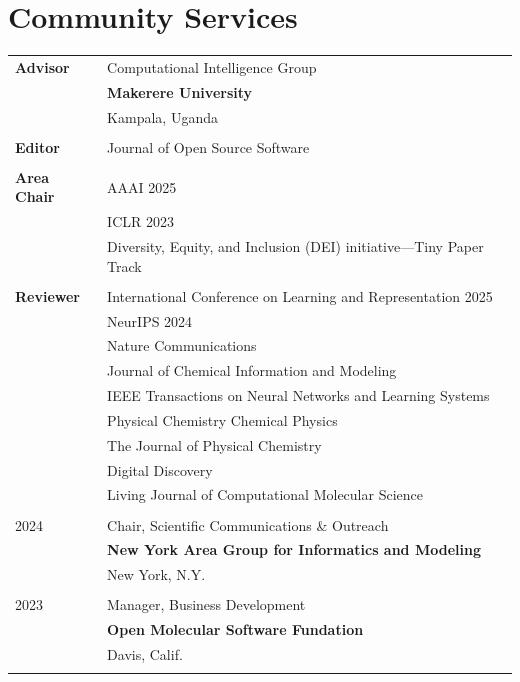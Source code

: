 \section{Community Services}
\begin{longtable}{p{} p{} }

\textbf{Advisor} & Computational Intelligence Group \\
& \textbf{Makerere University} \\
& Kampala, Uganda \\\\


\textbf{Editor} & Journal of Open Source Software \\\\

\textbf{Area Chair} 
& AAAI 2025\\
& ICLR 2023\\
& Diversity, Equity, and Inclusion (DEI) initiative---Tiny Paper Track \\\\

\textbf{Reviewer} & {International Conference on Learning and Representation 2025} \\
& {NeurIPS 2024} \\
& {Nature Communications} \\
& {Journal of Chemical Information and Modeling}\\
& {IEEE Transactions on Neural Networks and Learning Systems}\\
& {Physical Chemistry Chemical Physics} \\
& {The Journal of Physical Chemistry} \\
& {Digital Discovery} \\
& Living Journal of Computational Molecular Science \\\\

\textsc{2024} & Chair, Scientific Communications \& Outreach\\
& \textbf{New York Area Group for Informatics and Modeling} \\
& New York, N.Y. \\\\


\textsc{2023} & Manager, Business Development \\
& \textbf{Open Molecular Software Fundation} \\
& Davis, Calif. \\\\




\end{longtable}


